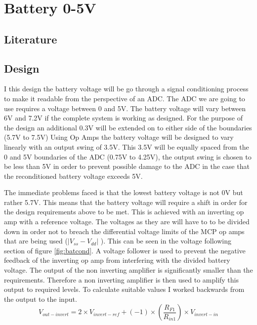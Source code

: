 \chapter{Battery 0-5V}\label{ch:Battery voltage conversion}
\section{Literature}\label{sec:loadcontrol_lit}


\section{Design}\label{sec:loadcontrol_design}

I this design the battery voltage will be go through a signal conditioning process to make it readable from the perspective of an ADC. The ADC we are going to use requires a voltage between 0 and 5V. The battery voltage will vary between 6V and 7.2V if the complete system is working as designed. For the purpose of the design an additional 0.3V will be extended on to either side of the boundaries (5.7V to 7.5V)  Using Op Amps the battery voltage will be designed to vary linearly with an output swing of 3.5V. This 3.5V will be equally spaced from the 0 and 5V boundaries of the ADC (0.75V to 4.25V), the output swing is chosen to be less than 5V in order to prevent possible damage to the ADC in the case that the reconditioned battery voltage exceeds 5V.
\newline 

The immediate problems faced is that the lowest battery voltage is not 0V but rather 5.7V. This means that the battery voltage will require a shift in order for the design requirements above to be met. This is achieved with an inverting op amp with a reference voltage. The voltages as they are will have to to be divided down in order not to breach the differential voltage limits of the MCP op amps that are being used ($|V_{ss}-V_{dd}|$ \cite{MCP}). This can be seen in the voltage following section of figure \ref{fig:batcond}. A voltage follower is used to prevent the negative feedback of the inverting op amp from interfering with the divided battery voltage. The output of the non inverting amplifier is significantly smaller than the requirements. Therefore a non inverting amplifier is then used to amplify this output to required levels.
\newline
To calculate suitable values I worked backwards from the output to the input.
\begin{equation}
V_{out-invert}=2\times V_{invert-ref}+(-1)\times (\frac{R_{F1}}{R_{in1}})\times V_{invert-in}
    \label{eq:invert}
\end{equation}

